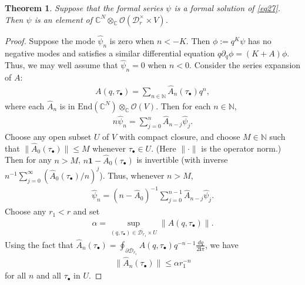 \documentclass[12pt,b5paper,notitlepage]{report}
\theoremstyle{definition}
\theoremstyle{plain}
\newtheorem{thm}[df]{Theorem}
\newcommand{\mc}{\mathcal}
\newcommand{\wht}{\widehat}
\newcommand{\ovl}{\overline}
\newcommand{\End}{\mathrm{End}} %
\newcommand{\id}{\mathbf{1}}
\newcommand{\scr}{\mathscr}
\newcommand{\im}{\mathbf{i}}
\newcommand{\mbb}{\mathbb}
\newcommand{\blt}{\bullet}
\newcommand{\Cbb}{\mathbb C}
\numberwithin{equation}{section}
\begin{document}
\begin{thm}\label{lb14}
Suppose that the formal series $\psi$ is a formal solution of \eqref{eq27}. Then $\psi$ is an element of $\Cbb^N\otimes_\Cbb\scr O(\mc D_r^\times\times V)$.
\end{thm}

\begin{proof}
Suppose the mode $\wht\psi_n$ is zero when $n<-K$. Then $\phi:=q^K\psi$ has no negative modes and satisfies a similar differential equation $q\partial_q\phi=(K+A)\phi$. Thus,  we may well assume that $\wht\psi_n=0$ when $n<0$. Consider the series expansion of $A$:
\begin{align*}
A(q,\tau_\blt)=\sum_{n\in\mbb N}\wht A_n(\tau_\blt)q^n,
\end{align*}
where each $\wht A_n$ is  in $\End(\Cbb^N)\otimes_\Cbb\scr O(V)$.  Then for each $n\in\mbb N$,
\begin{align*}
n\wht\psi_n=\sum_{j=0}^n\wht A_{n-j}\wht\psi_j.
\end{align*}
Choose any open subset $U$ of $V$ with compact closure, and choose $M\in\mbb N$ such that $\lVert\wht A_0(\tau_\bullet)\lVert\leq M$ whenever $\tau_\blt\in U$. (Here $\lVert\cdot\lVert$ is the operator norm.) Then for any $n>M$, $n\id-\wht A_0(\tau_\blt)$ is invertible (with inverse $n^{-1}\sum_{j=0}^\infty(\wht A_0(\tau_\blt)/n)^j $). Thus, whenever $n>M$,
\begin{align}
\wht\psi_n=(n-\wht A_0)^{-1}\sum_{j=0}^{n-1}\wht A_{n-j}\wht\psi_j.\label{eq25}
\end{align}
Choose any $r_1<r$ and set
\begin{align}
\alpha=\sup_{(q,\tau_\blt)\in {\ovl{\mc D_{r_1}}\times U}}\lVert A(q,\tau_\blt)\lVert.\label{eq28}
\end{align}
Using the fact that $\wht A_n(\tau_\blt)=\oint_{\partial \mc D_{r_1}} A(q,\tau_\blt)q^{-n-1}\frac{dq}{2\im\pi}$, we have
\begin{align}
\lVert\wht A_n(\tau_\blt)\lVert \leq \alpha r_1^{-n}\label{eq222}
\end{align}
for all $n$ and all  $\tau_\blt$ in $U$.



\end{proof}
\end{document}
